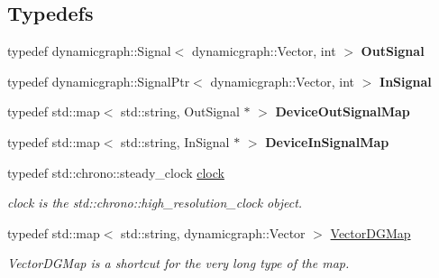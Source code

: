 \subsection*{Typedefs}
\begin{DoxyCompactItemize}
\item 
\mbox{\label{namespacedynamic__graph_a9f7c2bba6c653b0b54f5daff8daa1195}} 
typedef dynamicgraph\+::\+Signal$<$ dynamicgraph\+::\+Vector, int $>$ {\bfseries Out\+Signal}
\item 
\mbox{\label{namespacedynamic__graph_a739352a5fe7af6c341a822010fa06d1e}} 
typedef dynamicgraph\+::\+Signal\+Ptr$<$ dynamicgraph\+::\+Vector, int $>$ {\bfseries In\+Signal}
\item 
\mbox{\label{namespacedynamic__graph_ae168c2ee7d976fe18dd9c7a63642dd48}} 
typedef std\+::map$<$ std\+::string, Out\+Signal $\ast$ $>$ {\bfseries Device\+Out\+Signal\+Map}
\item 
\mbox{\label{namespacedynamic__graph_a96a57e0d53be372bae053f444016e171}} 
typedef std\+::map$<$ std\+::string, In\+Signal $\ast$ $>$ {\bfseries Device\+In\+Signal\+Map}
\item 
typedef std\+::chrono\+::steady\+\_\+clock \hyperlink{namespacedynamic__graph_aca70acb5331a18e090e49b3d85290a7e}{clock}
\begin{DoxyCompactList}\small\item\em clock is the std\+::chrono\+::high\+\_\+resolution\+\_\+clock object. \end{DoxyCompactList}\item 
\mbox{\label{namespacedynamic__graph_abd184187f3bc15df5e227d866529e4a7}} 
typedef std\+::map$<$ std\+::string, dynamicgraph\+::\+Vector $>$ \hyperlink{namespacedynamic__graph_abd184187f3bc15df5e227d866529e4a7}{Vector\+D\+G\+Map}
\begin{DoxyCompactList}\small\item\em Vector\+D\+G\+Map is a shortcut for the very long type of the map. \end{DoxyCompactList}\item 
\mbox{\label{namespacedynamic__graph_a51b66113dc1d4eee03abd7779479cc69}} 

\end{DoxyCompactItemize}
